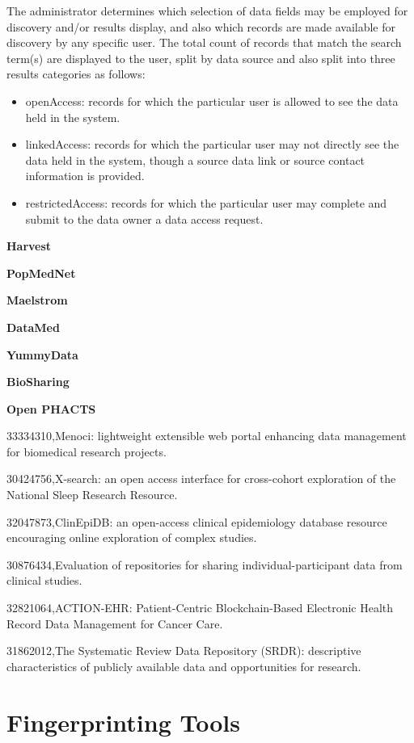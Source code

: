 The administrator determines which selection of data fields may be employed for
discovery and/or results display, and also which records are made available for
discovery by any specific user.
The total count of records that match the search term(s) are displayed to the user,
split by data source and also split into three results categories as follows:
\begin{itemize}
    \item openAccess: records for which the particular user is allowed to see the data
        held in the system.
    \item linkedAccess: records for which the particular user may not directly see the
        data held in the system, though a source data link or source contact
        information is provided.
    \item restrictedAccess: records for which the particular user may complete and
        submit to the data owner a data access request.
\end{itemize}

\textbf{Harvest \cite{harvest}}

\textbf{PopMedNet \cite{popmednet}}

\textbf{Maelstrom \cite{maelstrom}}

\textbf{DataMed \cite{datamed}}

\textbf{YummyData \cite{yummydata}}

\textbf{BioSharing \cite{biosharing}}

\textbf{Open PHACTS \cite{phacts}}

33334310,Menoci: lightweight extensible web portal enhancing data management for biomedical research projects.

30424756,X-search: an open access interface for cross-cohort exploration of the National Sleep Research Resource.

32047873,ClinEpiDB: an open-access clinical epidemiology database resource encouraging online exploration of complex studies.

30876434,Evaluation of repositories for sharing individual-participant data from clinical studies.

32821064,ACTION-EHR: Patient-Centric Blockchain-Based Electronic Health Record Data Management for Cancer Care.

31862012,The Systematic Review Data Repository (SRDR): descriptive characteristics of publicly available data and opportunities for research.

\section{Fingerprinting Tools}

